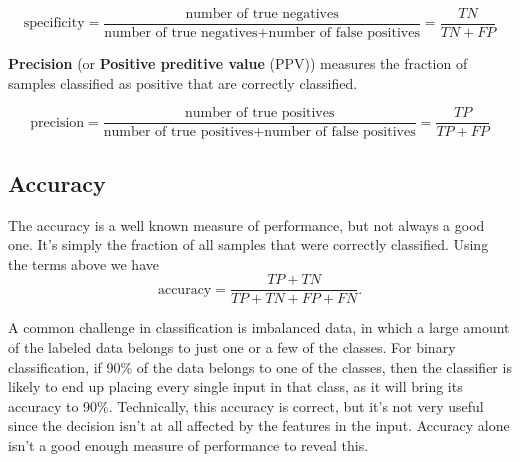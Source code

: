 $$\text{specificity} = \frac{\text{number of true negatives}}{\text{number of true negatives} + \text{number of false positives}} = \frac{TN}{TN + FP}$$

\noindent \textbf{Precision} (or \textbf{Positive preditive value} (PPV)) measures the fraction
of samples classified as positive that are correctly classified.

$$\text{precision} = \frac{\text{number of true positives}}{\text{number of true positives} + \text{number of false positives}} = \frac{TP}{TP + FP}$$

\subsection{Accuracy}
The accuracy is a well known measure of performance, but not always a good one. 
It's simply the fraction of all samples that were correctly classified. Using the 
terms above we have
$$\text{accuracy} = \frac{TP + TN}{TP + TN + FP + FN}.$$

\noindent A common challenge in classification is imbalanced data, in which a large
amount of the labeled data belongs to just one or a few of the classes.
For binary classification, if 90\% of the data belongs to one of the classes,
then the classifier is likely to end up placing every single
input in that class, as it will bring its accuracy to 90\%. Technically, this
accuracy is correct, but it's not very useful since the decision isn't at all
affected by the features in the input. Accuracy alone isn't a good enough
measure of performance to reveal this.

